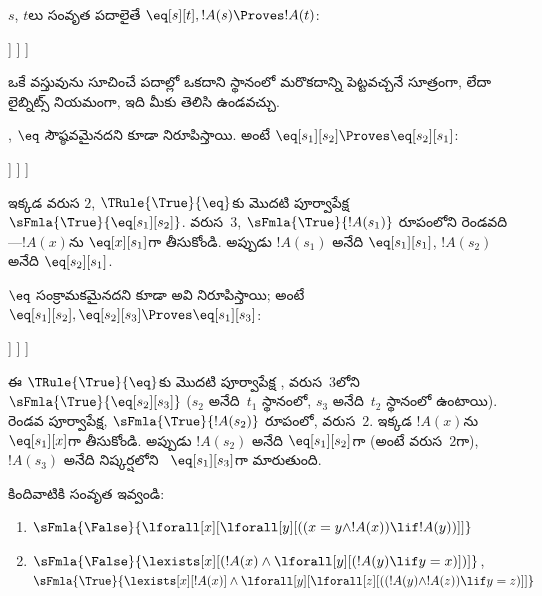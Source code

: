 \documentclass[../../../include/open-logic-section]{subfiles}
\begin{document}
\begin{ex}
$s$, $t$లు సంవృత పదాలైతే $\eq[s][t], !A(s) \Proves !A(t)$:
\begin{oltableau}
  [\sFmla{\False}{\formula{A}(t)}, just = \TAss
    [\sFmla{\True}{\eq[s][t]}, just = \TAss
      [\sFmla{\True}{\formula{A}(s)}, just = \TAss
        [\sFmla{\True}{\formula{A}(t)}, just={\TRule{\True}{\eq}[2, 3]}, close]
      ]
    ]
  ]
\end{oltableau}
ఒకే వస్తువును సూచించే పదాల్లో ఒకదాని స్థానంలో మరొకదాన్ని పెట్టవచ్చనే
సూత్రంగా, లేదా లైబ్నిట్స్ నియమంగా, ఇది మీకు తెలిసి ఉండవచ్చు.

, $\eq$ సౌష్ఠవమైనదని కూడా నిరూపిస్తాయి. అంటే
$\eq[s_1][s_2] \Proves \eq[s_2][s_1]$:
\begin{oltableau}
  [\sFmla{\False}{\eq[s_2][s_1]}, just = \TAss
    [\sFmla{\True}{\eq[s_1][s_2]}, just = \TAss
      [\sFmla{\True}{\eq[s_1][s_1]}, just = {$\eq$}
        [\sFmla{\True}{\eq[s_2][s_1]}, just = {\TRule{\True}{\eq}[2, 3]}, close]
      ]
    ]
  ]
\end{oltableau}
ఇక్కడ వరుస $2$, $\TRule{\True}{\eq}$కు మొదటి పూర్వాపేక్ష
~$\sFmla{\True}{\eq[s_1][s_2]}$. వరుస~$3$,
$\sFmla{\True}{!A(s_1)}$ రూపంలోని రెండవది---$!A(x)$ను
$\eq[x][s_1]$గా తీసుకోండి. అప్పుడు $!A(s_1)$ అనేది
$\eq[s_1][s_1]$, $!A(s_2)$ అనేది $\eq[s_2][s_1]$.

$\eq$ సంక్రామకమైనదని కూడా అవి నిరూపిస్తాయి; అంటే
$\eq[s_1][s_2], \eq[s_2][s_3] \Proves \eq[s_1][s_3]$:
\begin{oltableau}
  [\sFmla{\False}{\eq[s_1][s_3]}, just = \TAss
    [\sFmla{\True}{\eq[s_1][s_2]}, just = \TAss
      [\sFmla{\True}{\eq[s_2][s_3]}, just = \TAss
        [\sFmla{\True}{\eq[s_1][s_3]}, just = {\TRule{\True}{\eq}[3, 2]}, close]
      ]
    ]
  ]
\end{oltableau}
ఈ  $\TRule{\True}{\eq}$కు మొదటి పూర్వాపేక్ష
, వరుస~$3$లోని $\sFmla{\True}{\eq[s_2][s_3]}$
($s_2$ అనేది~$t_1$ స్థానంలో, $s_3$ అనేది~$t_2$ స్థానంలో ఉంటాయి). రెండవ
పూర్వాపేక్ష, $\sFmla{\True}{!A(s_2)}$ రూపంలో, వరుస~$2$. ఇక్కడ
$!A(x)$ను $\eq[s_1][x]$గా తీసుకోండి. అప్పుడు $!A(s_2)$ అనేది
$\eq[s_1][s_2]$గా (అంటే వరుస~$2$గా), $!A(s_3)$ అనేది నిష్కర్షలోని
~$\eq[s_1][s_3]$గా మారుతుంది.
\end{ex}

\begin{prob}
కిందివాటికి సంవృత  ఇవ్వండి:
\begin{enumerate}
\item $\sFmla{\False}{\lforall[x][\lforall[y][((x = y \land !A(x))
      \lif !A(y))]]}$
\item $\sFmla{\False}{\lexists[x][(!A(x) \land
    \lforall[y][(!A(y) \lif y = x)])]}$,\\
  $\sFmla{\True}{\lexists[x][!A(x)] \land
    \lforall[y][\lforall[z][((!A(y) \land !A(z)) \lif y = z)]]}$
\end{enumerate}
\end{prob}
\end{document}
